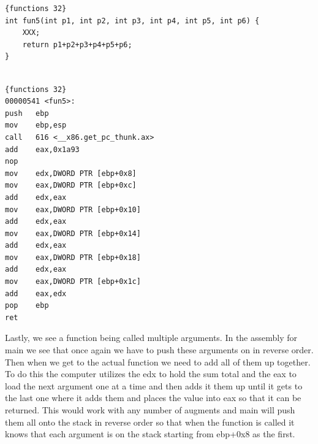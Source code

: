 \documentclass{report}
\begin{document}
\begin{minipage}{.45\textwidth}
\begin{lstlisting}[caption=Function code (fun5),frame=tlrb,framexrightmargin=-15pt]{functions 32}
int fun5(int p1, int p2, int p3, int p4, int p5, int p6) {
    XXX;
    return p1+p2+p3+p4+p5+p6;
}


\end{lstlisting}
\end{minipage}
\begin{minipage}{.45\textwidth}
\begin{lstlisting}[caption=assembly 32bit (fun5),frame=tlrb]{functions 32}
00000541 <fun5>:
push   ebp
mov    ebp,esp
call   616 <__x86.get_pc_thunk.ax>
add    eax,0x1a93
nop
mov    edx,DWORD PTR [ebp+0x8]
mov    eax,DWORD PTR [ebp+0xc]
add    edx,eax
mov    eax,DWORD PTR [ebp+0x10]
add    edx,eax
mov    eax,DWORD PTR [ebp+0x14]
add    edx,eax
mov    eax,DWORD PTR [ebp+0x18]
add    edx,eax
mov    eax,DWORD PTR [ebp+0x1c]
add    eax,edx
pop    ebp
ret    
\end{lstlisting}
\end{minipage}
 \newline
 Lastly, we see a function being called multiple arguments.  In the assembly for main we see that once again we have to push these arguments on in reverse order.  Then when we get to the actual function we need to add all of them up together.  To do this the computer utilizes the edx to hold the sum total and the eax to load the next argument one at a time and then adds it them up until it gets to the last one where it adds them and places the value into eax so that it can be returned.  This would work with any number of augments and main will push them all onto the stack in reverse order so that when the function is called it knows that each argument is on the stack starting from ebp+0x8 as the first.
 
\end{document}
